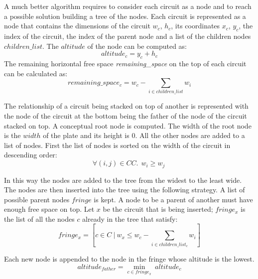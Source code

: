         A much better algorithm requires to consider each circuit as a node and to reach a possible solution building a tree of the nodes. 
        Each circuit is represented as a node that contains the dimensions of the circuit $w_c$, $h_c$, its coordinates 
        $x_c$, $y_c$, the index of the circuit, the index of the parent node and a list of the children nodes 
        $children\_list$. The $altitude$ of the node can be computed as:
        \begin{equation}
            altitude_c = y_c + h_c
        \end{equation}
        The remaining horizontal free space \textit{remaining\_space} on the top of each circuit can be calculated as:
        \begin{equation}
            remaining\_space_c = w_c - \sum_{i \in children\_list} w_i
        \end{equation}
        
        The relationship of a circuit being stacked on top of another is represented with the node of the circuit at the bottom 
        being the father of the node of the circuit stacked on top.
        A conceptual root node is computed. The width of the root node is the $width$ of the plate and its height is 0.
        All the other nodes are added to a list of nodes.
        First the list of nodes is sorted on the width of the circuit in descending order:
        \begin{equation}
            \forall (i,j) \in CC.\ \ w_i \geq w_j \ 
        \end{equation}
        
        In this way the nodes are added to the tree from the widest to the least wide.
        The nodes are then inserted into the tree using the following strategy. A list of possible parent nodes $fringe$ is kept. 
        A node to be a parent of another must have enough free space on top. Let $x$ be the circuit that 
        is being inserted; $fringe_x$ is the list of all the nodes $c$ already in the tree that satisfy: 
        \begin{equation}
            fringe_x = \left[c \in C\ |\ w_x \leq w_c - \sum_{i \in children\_list_c} w_i\right]
        \end{equation}
        
        Each new node is appended to the node in the fringe whose altitude is the lowest.
        \begin{equation}
            altitude_{father} = \min_{c \in fringe_x}\ {altitude_c} 
        \end{equation}


